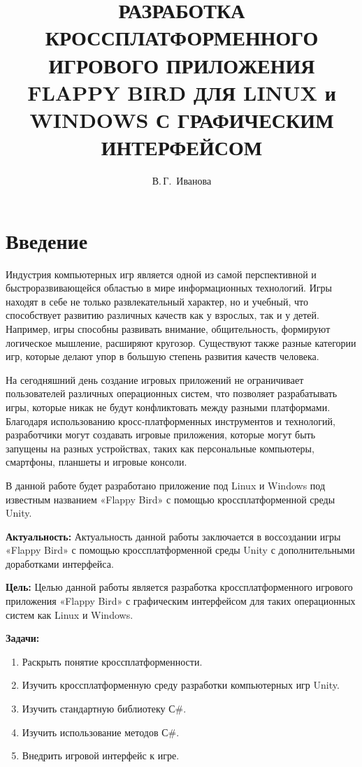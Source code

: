\documentclass[14pt, oneside]{altsu-report}
\title{РАЗРАБОТКА КРОССПЛАТФОРМЕННОГО ИГРОВОГО ПРИЛОЖЕНИЯ FLAPPY BIRD ДЛЯ LINUX и WINDOWS С ГРАФИЧЕСКИМ ИНТЕРФЕЙСОМ}
\author{В.\,Г.~Иванова}
\institute{Институт цифровых технологий, электроники и физики}
\date{\the\year}
\begin{document}
\maketitle

\setcounter{page}{2}
\makeabstract
\tableofcontents

\chapter*{Введение}

Индустрия компьютерных игр является одной из самой перспективной и быстроразвивающейся областью в мире информационных технологий. Игры находят в себе не только развлекательный характер, но и учебный, что способствует развитию различных качеств как у взрослых, так и у детей. Например, игры способны развивать внимание, общительность, формируют логическое мышление, расширяют кругозор. Существуют также разные категории игр, которые делают упор в большую степень развития качеств человека.

На сегодняшний день создание игровых приложений не ограничивает пользователей различных операционных систем, что позволяет разрабатывать игры, которые никак не будут конфликтовать между разными платформами. Благодаря использованию кросс-платформенных инструментов и технологий, разработчики могут создавать игровые приложения, которые могут быть запущены на разных устройствах, таких как персональные компьютеры, смартфоны, планшеты и игровые консоли.

В данной работе будет разработано приложение под  Linux и Windows под известным названием «Flappy Bird» с помощью кроссплатформенной среды Unity.

\textbf{Актуальность:} 
Актуальность данной работы заключается в воссоздании игры «Flappy Bird» с помощью кроссплатформенной среды Unity с дополнительными доработками интерфейса. 

\textbf{Цель:}
Целью данной работы является разработка кроссплатформенного игрового приложения «Flappy Bird» с графическим интерфейсом для таких операционных систем как Linux и Windows.

\textbf{Задачи:}
\begin{enumerate}
\item Раскрыть понятие кроссплатформенности.
\item Изучить кроссплатформенную среду разработки компьютерных игр Unity.
\item Изучить стандартную библиотеку С\#.
\item Изучить использование методов С\#.
\item Внедрить игровой интерфейс к игре.
\end{enumerate}
\end{document}
